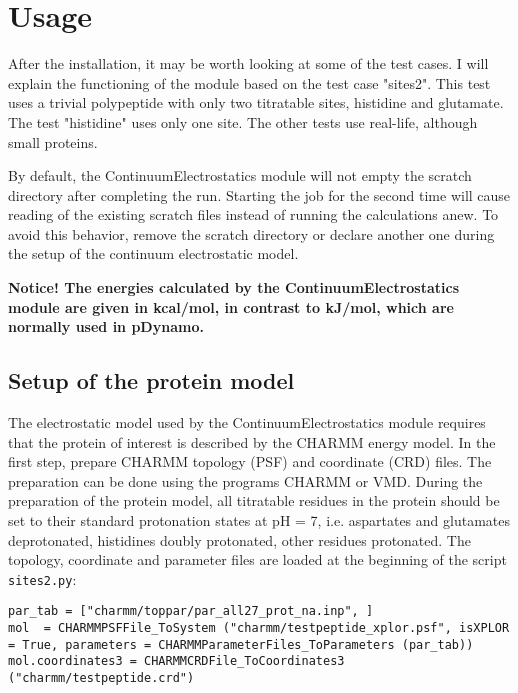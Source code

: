 \documentclass[a4paper,11pt]{article}
\newcommand{\modulename}{ContinuumElectrostatics\xspace}
\begin{document}
\section{Usage}
After the installation, it may be worth looking at some of the test cases.
%
I will explain the functioning of the module based on the test case "sites2".
%
This test uses a trivial polypeptide with only two titratable sites,
histidine and glutamate.
%
The test "histidine" uses only one site. The other tests use real-life,
although small proteins.


By default, the \modulename module will not empty the scratch directory
after completing the run.
%
Starting the job for the second time will cause reading of the existing 
scratch files instead of running the calculations anew.
%
To avoid this behavior, remove the scratch directory or declare another one
during the setup of the continuum electrostatic model.

\textbf{Notice! The energies calculated by the \modulename module are 
given in kcal/mol, in contrast to kJ/mol, which are normally used 
in pDynamo.}


\subsection{Setup of the protein model}
The electrostatic model used by the \modulename module requires that the protein
of interest is described by the CHARMM energy model\cite{MacKerell1998}.
%
In the first step, prepare CHARMM topology (PSF) and coordinate (CRD) files.
%
The preparation can be done using the programs CHARMM\cite{CHARMM_Brooks1983}
or VMD\cite{VMD1996}.
%
During the preparation of the protein model, all titratable residues in the protein
should be set to their standard protonation states at pH = 7, i.e. aspartates
and glutamates deprotonated, histidines doubly protonated, other residues
protonated.
%
The topology, coordinate and parameter files are loaded at the
beginning of the script \texttt{sites2.py}:

{\footnotesize \begin{lstlisting}
par_tab = ["charmm/toppar/par_all27_prot_na.inp", ]
mol  = CHARMMPSFFile_ToSystem ("charmm/testpeptide_xplor.psf", isXPLOR = True, parameters = CHARMMParameterFiles_ToParameters (par_tab))
mol.coordinates3 = CHARMMCRDFile_ToCoordinates3 ("charmm/testpeptide.crd")
\end{lstlisting} }
\end{document}
